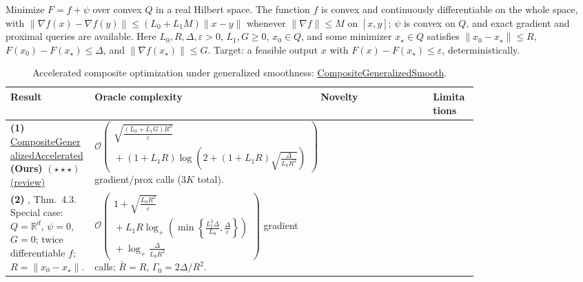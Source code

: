 \begin{table}[tp]
\centering
\caption{Accelerated composite optimization under generalized smoothness: \href{https://github.com/k3nfalt/longtails/blob/main/LongTails/Setups/CompositeGeneralizedSmooth.lean}{CompositeGeneralizedSmooth}.}\label{tab:CompositeGeneralizedSmooth}
\parbox{\linewidth}{\footnotesize Minimize $F=f+\psi$ over convex $Q$ in a real Hilbert space. The function $f$ is convex and continuously differentiable on the whole space, with $\|\nabla f(x)-\nabla f(y)\|\le (L_0+L_1M)\|x-y\|$ whenever $\|\nabla f\|\le M$ on $[x,y]$; $\psi$ is convex on $Q$, and exact gradient and proximal queries are available. Here $L_0,R,\Delta,\varepsilon>0$, $L_1,G\ge0$, $x_0\in Q$, and some minimizer $x_\star\in Q$ satisfies $\|x_0-x_\star\|\le R$, $F(x_0)-F(x_\star)\le\Delta$, and $\|\nabla f(x_\star)\|\le G$. Target: a feasible output $x$ with $F(x)-F(x_\star)\le\varepsilon$, deterministically.}\par\smallskip
\begin{threeparttable}
\footnotesize
\setlength{\tabcolsep}{4pt}\renewcommand{\arraystretch}{1.25}
\begin{tabularx}{\linewidth}{@{}>{\raggedright\arraybackslash}p{0.18\linewidth}>{\raggedright\arraybackslash}p{0.37\linewidth}>{\raggedright\arraybackslash}p{0.24\linewidth}>{\raggedright\arraybackslash}X@{}}
\toprule
\textbf{Result} & \textbf{Oracle complexity} & \textbf{Novelty} & \textbf{Limitations} \\
\midrule
\textbf{(1)} \href{https://github.com/k3nfalt/longtails/blob/main/LongTails/Theorems/CompositeGeneralizedAccelerated.lean}{Composite\allowbreak Generalized\allowbreak Accelerated} \textbf{(Ours)} $(\star\star\star)$ \href{https://github.com/k3nfalt/longtails/blob/main/scripts/reviews/CompositeGeneralizedAccelerated.md}{(review)}
& $\displaystyle\mathcal{O}\!\left(\begin{gathered}\sqrt{\frac{(L_0+L_1G)R^2}{\varepsilon}}\\ {}+(1+L_1R)\log\!\left(2+(1+L_1R)\sqrt{\frac{\Delta}{L_0R^2}}\right)\end{gathered}\right)$ gradient/prox calls ($3K$ total). & & \\
\midrule[1.2pt]
\textbf{(2)} \citep{cgsTyurin2026v2}, Thm.~4.3. Special case: $Q=\mathbb{R}^d$, $\psi=0$, $G=0$; twice differentiable $f$; $R=\|x_0-x_\star\|$.
& $\displaystyle\mathcal{O}\!\left(\begin{gathered}1+\sqrt{\frac{L_0R^2}{\varepsilon}}\\ {}+L_1R\log_+\!\left(\min\!\left\{\frac{L_1^2\Delta}{L_0},\frac{\Delta}{\varepsilon}\right\}\right)\\ {}+\log_+\!\frac{\Delta}{L_0R^2}\end{gathered}\right)$ gradient calls; $\bar R=R$, $\Gamma_0=2\Delta/R^2$.

\end{tabularx}
\end{threeparttable}
\end{table}
